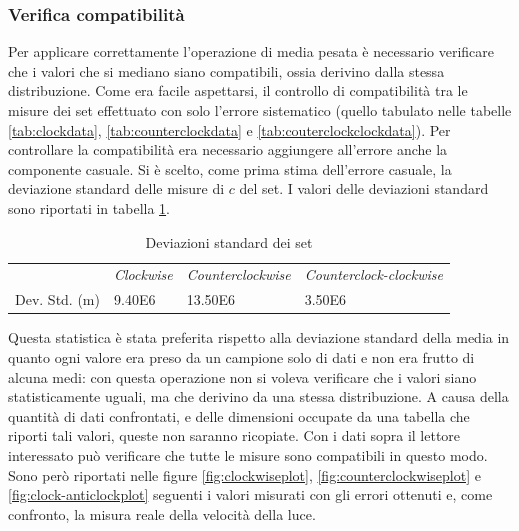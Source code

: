 \documentclass[a4paper,11pt]{article}
\begin{document}
	\subsubsection{Verifica compatibilità} \label{subsubsec:vercomp}
	Per applicare correttamente l'operazione di media pesata è necessario verificare che i valori che si mediano siano compatibili, ossia derivino dalla stessa distribuzione. Come era facile aspettarsi, il controllo di compatibilità tra le misure dei set effettuato con solo l'errore sistematico (quello tabulato nelle tabelle \ref{tab:clockdata}, \ref{tab:counterclockdata} e \ref{tab:couterclockclockdata}). Per controllare la compatibilità era necessario aggiungere all'errore anche la componente casuale. Si è scelto, come prima stima dell'errore casuale, la deviazione standard delle misure di $ c $ del set. I valori delle deviazioni standard sono riportati in tabella \ref{tab:setdevstd}.
	

	\begin{table}[htbp]
		\centering
		\caption{Deviazioni standard dei set}
		\vspace{0.1cm}
		\begin{tabular}{llll}
			\rowcolor[rgb]{ .741,  .843,  .933}       & \emph{Clockwise} & \emph{Counterclockwise} & \emph{Counterclock-clockwise} \\
			\rowcolor[rgb]{ .741,  .843,  .933} Dev. Std. (\si{\meter}) & \cellcolor[rgb]{ .859,  .859,  .859} \num{9.40E6} & \cellcolor[rgb]{ .859,  .859,  .859} \num{13.50E6} & \cellcolor[rgb]{ .859,  .859,  .859} \num{3.50E6} \\
		\end{tabular}%
		\label{tab:setdevstd}%
	\end{table}%
	
	Questa statistica è stata preferita rispetto alla deviazione standard della media in quanto ogni valore era preso da un campione solo di dati e non era frutto di alcuna medi: con questa operazione non si voleva verificare che i valori siano statisticamente uguali, ma che derivino da una stessa distribuzione. A causa della quantità di dati confrontati, e delle dimensioni occupate da una tabella che riporti tali valori, queste non saranno ricopiate. Con i dati sopra il lettore interessato può verificare che tutte le misure sono compatibili in questo modo. Sono però riportati nelle figure \ref{fig:clockwiseplot}, \ref{fig:counterclockwiseplot} e \ref{fig:clock-anticlockplot} seguenti i valori misurati con gli errori ottenuti e, come confronto, la misura reale della velocità della luce.
	
\end{document}
